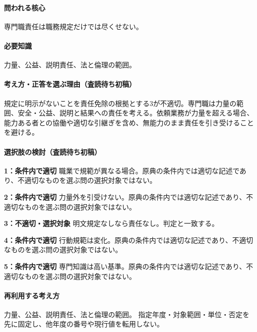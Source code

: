 \paragraph{問われる核心} 専門職責任は職務規定だけでは尽くせない。

\paragraph{必要知識} 力量、公益、説明責任、法と倫理の範囲。

\paragraph{考え方・正答を選ぶ理由（査読待ち初稿）} 規定に明示がないことを責任免除の根拠とする3が不適切。専門職は力量の範囲、安全・公益、説明と結果への責任を考える。依頼業務が力量を超える場合、能力ある者との協働や適切な引継ぎを含め、無能力のまま責任を引き受けることを避ける。

\paragraph{選択肢の検討（査読待ち初稿）}\mbox{}\par

\noindent\textbf{1：条件内で適切} 職業で規範が異なる場合。原典の条件内では適切な記述であり、不適切なものを選ぶ問の選択対象ではない。\par

\noindent\textbf{2：条件内で適切} 力量外を引受けない。原典の条件内では適切な記述であり、不適切なものを選ぶ問の選択対象ではない。\par

\noindent\textbf{3：不適切・選択対象} 明文規定なしなら責任なし。判定と一致する。\par

\noindent\textbf{4：条件内で適切} 行動規範は変化。原典の条件内では適切な記述であり、不適切なものを選ぶ問の選択対象ではない。\par

\noindent\textbf{5：条件内で適切} 専門知識は高い基準。原典の条件内では適切な記述であり、不適切なものを選ぶ問の選択対象ではない。\par

\paragraph{再利用する考え方} 力量、公益、説明責任、法と倫理の範囲。 指定年度・対象範囲・単位・否定を先に固定し、他年度の番号や現行値を転用しない。

